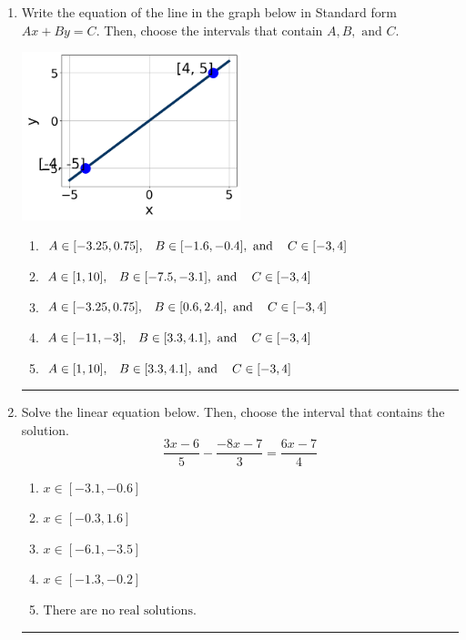 \documentclass[14pt]{extbook}
\newcommand{\litem}[1]{\item#1\hspace*{-1cm}\rule{\textwidth}{0.4pt}}
\begin{document}
\begin{enumerate}
{\begin{enumerate}[label=\Alph*.]
\end{enumerate} }
\litem{
Write the equation of the line in the graph below in Standard form $Ax+By=C$. Then, choose the intervals that contain $A, B, \text{ and } C$.
\begin{center}
    \includegraphics[width=0.5\textwidth]{../Figures/linearGraphToStandardCopyC.png}
\end{center}
\begin{enumerate}[label=\Alph*.]
\item \( A \in [-3.25, 0.75], \hspace{3mm} B \in [-1.6, -0.4], \text{ and } \hspace{3mm} C \in [-3, 4] \)
\item \( A \in [1, 10], \hspace{3mm} B \in [-7.5, -3.1], \text{ and } \hspace{3mm} C \in [-3, 4] \)
\item \( A \in [-3.25, 0.75], \hspace{3mm} B \in [0.6, 2.4], \text{ and } \hspace{3mm} C \in [-3, 4] \)
\item \( A \in [-11, -3], \hspace{3mm} B \in [3.3, 4.1], \text{ and } \hspace{3mm} C \in [-3, 4] \)
\item \( A \in [1, 10], \hspace{3mm} B \in [3.3, 4.1], \text{ and } \hspace{3mm} C \in [-3, 4] \)

\end{enumerate} }
\litem{
Solve the linear equation below. Then, choose the interval that contains the solution.\[ \frac{3x -6}{5} - \frac{-8x -7}{3} = \frac{6x -7}{4} \]\begin{enumerate}[label=\Alph*.]
\item \( x \in [-3.1, -0.6] \)
\item \( x \in [-0.3, 1.6] \)
\item \( x \in [-6.1, -3.5] \)
\item \( x \in [-1.3, -0.2] \)
\item \( \text{There are no real solutions.} \)


\end{enumerate}}
\end{enumerate}
\end{document}
